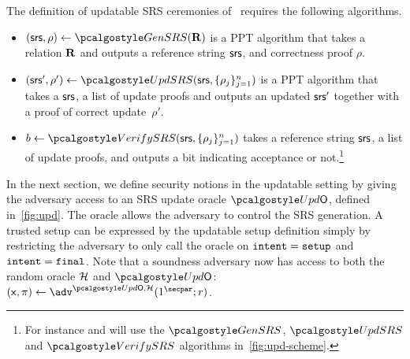 The definition of updatable SRS ceremonies of~\cite{C:GKMMM18} requires the following algorithms.

\begin{itemize} 
	\item
	$(\srs,\rho) \gets \kgen(\REL)$ is a PPT algorithm that takes a relation $\mathbf{R}$ and outputs a reference string $\mathsf{srs}$, and correctness proof $\rho$.
	\item
	$ (\srs',\rho') \gets \upd(\srs, \{\rho_j \}_{j=1}^n)$ is a PPT algorithm that takes a $\mathsf{srs}$, a list of update proofs and outputs an updated $\mathsf{srs}'$ together with a proof of correct update~$\rho'$. 
	\item
	$b \gets \verifyCRS(\srs, \{\rho_j \}_{j=1}^n)$ takes a reference string $\mathsf{srs}$, a list of update proofs, and outputs a bit indicating acceptance or not.\footnote{For instance \plonk{} and \marlin{} will use the $\kgen$, $\upd$ and $\verifyCRS$ algorithms in~\cref{fig:upd-scheme}.}
\end{itemize}


In the next section, we define security notions in the updatable setting by giving the adversary access to an SRS update oracle $\initU$, defined in~\cref{fig:upd}. The oracle allows the adversary to control the SRS generation. A trusted setup can be expressed by the updatable setup definition simply by restricting the adversary to only call the oracle on $\mathtt{intent} = \mathtt{setup}$ and $\mathtt{intent} = \mathtt{final}$. Note that a soundness adversary now has access to both the random oracle $\mathcal{H}$ and $\initU$:  $(\inp, \zkproof) \gets \adv^{\initU,\ro}(1^\secpar; r)$.

\newcommand*{\Scale}[2][4]{\scalebox{#1}{$#2$}}%


